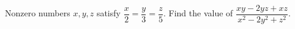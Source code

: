 Nonzero numbers $x, y, z$ satisfy $\dfrac{x}{2}=\dfrac{y}{3}=\dfrac{z}{5}$. Find the value of $\dfrac{xy-2yz+xz}{x^{2}-2y^{2}+z^{2}}$.

